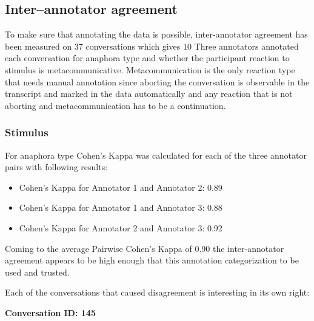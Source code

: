 \subsection{Inter--annotator agreement}

To make sure that annotating the data is possible,
inter-annotator agreement has been measured on 37 conversations which gives 10%
Three annotators annotated each conversation for anaphora type and
whether the participant reaction to stimulus is metacommunicative.
Metacommunication is the only reaction type that needs manual annotation since
aborting the conversation is
observable in the transcript and marked in the data automatically
and any reaction that is not aborting and metacommunication has to be a continuation.

\subsubsection{Stimulus}

For anaphora type Cohen's Kappa was calculated for each of the three annotator pairs
with following results:

\begin{itemize}
    \item Cohen's Kappa for Annotator 1 and Annotator 2: 0.89
    \item Cohen's Kappa for Annotator 1 and Annotator 3: 0.88
    \item Cohen's Kappa for Annotator 2 and Annotator 3: 0.92
\end{itemize}

Coming to the average Pairwise Cohen's Kappa of 0.90
the inter-annotator agreement appears to be high enough
that this annotation categorization to be used and trusted.

Each of the conversations that caused disagreement is interesting in its own right:


\textbf{Conversation ID: 145}

